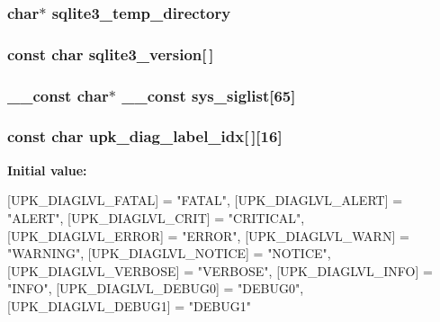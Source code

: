 \subsubsection[{sqlite3\_\-temp\_\-directory}]{\setlength{\rightskip}{0pt plus 5cm}char$\ast$ {\bf sqlite3\_\-temp\_\-directory}}\label{tp_8c_ada2f9f790df64f7ae8bc2b898b183be2}
\subsubsection[{sqlite3\_\-version}]{\setlength{\rightskip}{0pt plus 5cm}const char {\bf sqlite3\_\-version}[$\,$]}\label{tp_8c_a466e673c61615dd237c6917c2f95de44}
\subsubsection[{sys\_\-siglist}]{\setlength{\rightskip}{0pt plus 5cm}\_\-\_\-const char$\ast$ \_\-\_\-const {\bf sys\_\-siglist}[65]}\label{tp_8c_ab00bf959879fed652b40f0468b348f87}
\subsubsection[{upk\_\-diag\_\-label\_\-idx}]{\setlength{\rightskip}{0pt plus 5cm}const char {\bf upk\_\-diag\_\-label\_\-idx}[$\,$][16]\hspace{0.3cm}{\ttfamily  [static]}}\label{tp_8c_ae422812b612ba3ecf5f411f023416c38}
{\bfseries Initial value:}
\begin{DoxyCode}
 {
    [UPK_DIAGLVL_FATAL] = "FATAL",
    [UPK_DIAGLVL_ALERT] = "ALERT",
    [UPK_DIAGLVL_CRIT] = "CRITICAL",
    [UPK_DIAGLVL_ERROR] = "ERROR",
    [UPK_DIAGLVL_WARN] = "WARNING",
    [UPK_DIAGLVL_NOTICE] = "NOTICE",
    [UPK_DIAGLVL_VERBOSE] = "VERBOSE",
    [UPK_DIAGLVL_INFO] = "INFO",
    [UPK_DIAGLVL_DEBUG0] = "DEBUG0",
    [UPK_DIAGLVL_DEBUG1] = "DEBUG1"
}
\end{DoxyCode}
